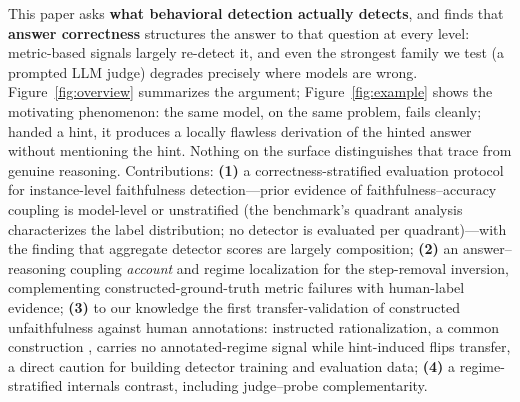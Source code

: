 \documentclass{article}
\begin{document}
This paper asks \textbf{what behavioral detection actually detects}, and finds that \textbf{answer correctness} structures the answer to that question at every level: metric-based signals largely re-detect it, and even the strongest family we test (a prompted LLM judge) degrades precisely where models are wrong. Figure~\ref{fig:overview} summarizes the argument; Figure~\ref{fig:example} shows the motivating phenomenon: the same model, on the same problem, fails cleanly; handed a hint, it produces a locally flawless derivation of the hinted answer without mentioning the hint. Nothing on the surface distinguishes that trace from genuine reasoning. Contributions: \textbf{(1)} a correctness-stratified evaluation protocol for instance-level faithfulness detection---prior evidence of faithfulness--accuracy coupling is model-level \citep{bentham2024disguised} or unstratified (the benchmark's quadrant analysis characterizes the label distribution; no detector is evaluated per quadrant)---with the finding that aggregate detector scores are largely composition; \textbf{(2)} an answer--reasoning coupling \emph{account} and regime localization for the step-removal inversion, complementing constructed-ground-truth metric failures \citep{gurarieh2026bonafide,zaman2025causal} with human-label evidence; \textbf{(3)} to our knowledge the first transfer-validation of constructed unfaithfulness against human annotations: instructed rationalization, a common construction \citep[cf.][]{offpolicy2025probes}, carries no annotated-regime signal while hint-induced flips transfer, a direct caution for building detector training and evaluation data; \textbf{(4)} a regime-stratified internals contrast, including judge--probe complementarity.
\end{document}
